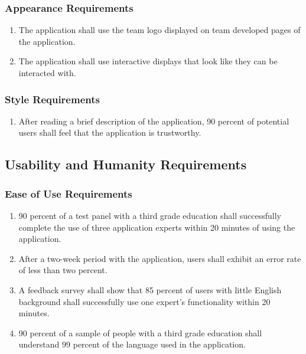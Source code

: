 \documentclass[titlepage]{article}
\newcounter{myCounter}
\begin{document}
\subsubsection{Appearance Requirements}
\label{ssub:appearance_requirements}
\begin{enumerate}[{LF}1. ]
    \setcounter{enumi}{\themyCounter}
    \item The application shall use the team logo displayed on team developed pages of the
    application. 
    \item The application shall use interactive displays that look like they can be interacted with.
    \setcounter{myCounter}{\theenumi}
\end{enumerate}

\subsubsection{Style Requirements}
\label{ssub:style_requirements}
\begin{enumerate}[{LF}1. ]
    \setcounter{enumi}{\themyCounter}
    \item After reading a brief description of the application, 90 percent of potential users shall
    feel that the application is trustworthy.
	
	
\end{enumerate}


\subsection{Usability and Humanity Requirements}
\label{sub:usability_and_humanity_requirements}
\setcounter{myCounter}{0}

\subsubsection{Ease of Use Requirements}
\label{ssub:ease_of_use_requirements}
\begin{enumerate}[{UH}1. ]
    \setcounter{enumi}{\themyCounter}
    \item 90 percent of a test panel with a third grade education shall successfully complete the
    use of three application experts within 20 minutes of using the application. 
    \item After a two-week period with the application, users shall exhibit an error rate of less
    than two percent.
    \item A feedback survey shall show that 85 percent of users with little English background shall
    successfully use one expert's functionality within 20 minutes. 
    \item 90 percent of a sample of people with a third grade education shall understand 99 percent
    of the language used in the application.      
	\setcounter{myCounter}{\theenumi}
\end{enumerate}
\end{document}
